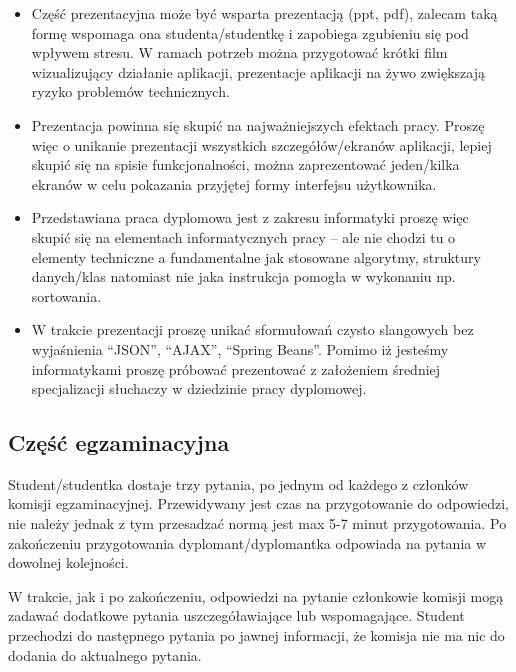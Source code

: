 \documentclass[12pt,a4paper]{article}
\begin{document}
\begin{itemize}
\item Część prezentacyjna może być wsparta prezentacją (ppt, pdf), zalecam taką formę wspomaga ona studenta/studentkę i zapobiega zgubieniu się pod wpływem stresu. W ramach potrzeb można przygotować krótki film wizualizujący działanie aplikacji, prezentacje aplikacji na żywo zwiększają ryzyko problemów technicznych.

\item Prezentacja powinna się skupić na najważniejszych efektach pracy. Proszę więc o unikanie prezentacji wszystkich szczegółów/ekranów aplikacji, lepiej skupić się na spisie funkcjonalności, można zaprezentować jeden/kilka ekranów w celu pokazania przyjętej formy interfejsu użytkownika.

\item Przedstawiana praca dyplomowa jest z zakresu informatyki proszę więc skupić się na elementach informatycznych pracy -- ale nie chodzi tu o elementy techniczne a fundamentalne jak stosowane algorytmy, struktury danych/klas natomiast nie jaka instrukcja pomogła w wykonaniu np. sortowania.

\item W trakcie prezentacji proszę unikać sformułowań czysto slangowych bez wyjaśnienia ``JSON'', ``AJAX'', ``Spring Beans''. Pomimo iż jesteśmy informatykami proszę próbować prezentować z założeniem średniej specjalizacji słuchaczy w dziedzinie pracy dyplomowej.
\end{itemize}

\subsection{Część egzaminacyjna}

Student/studentka dostaje trzy pytania, po jednym od każdego z członków komisji egzaminacyjnej. Przewidywany jest czas na przygotowanie do odpowiedzi, nie należy jednak z tym przesadzać normą jest max 5-7 minut przygotowania. Po zakończeniu przygotowania dyplomant/dyplomantka odpowiada na pytania w dowolnej kolejności.

W trakcie, jak i po zakończeniu, odpowiedzi na pytanie członkowie komisji mogą zadawać dodatkowe pytania uszczegóławiające lub wspomagające. Student przechodzi do następnego pytania po jawnej informacji, że komisja nie ma nic do dodania do aktualnego pytania.






\end{document}
